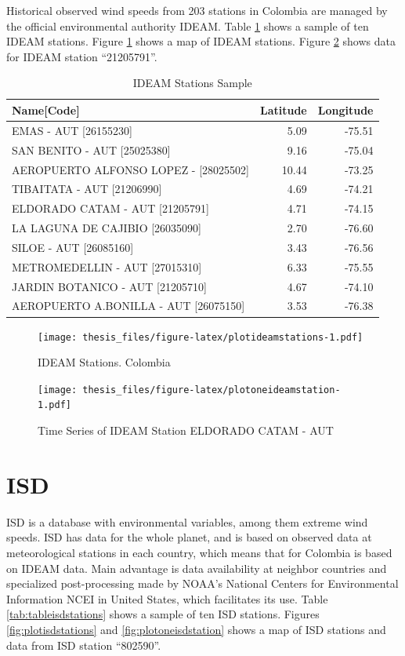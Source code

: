 \documentclass[12pt,oneside]{reedthesis}
\begin{document}
Historical observed wind speeds from 203 stations in Colombia are managed by the official environmental authority IDEAM. Table \ref{tab:tableideamstations} shows a sample of ten IDEAM stations. Figure \ref{fig:plotideamstations} shows a map of IDEAM stations. Figure \ref{fig:plotoneideamstation} shows data for IDEAM station ``21205791''.

\begingroup\fontsize{10}{12}\selectfont
\begin{longtable}[t]{lrr}
\caption[IDEAM Stations Sample]{\label{tab:tableideamstations}IDEAM Stations Sample}\\
\toprule
Name[Code] & Latitude & Longitude\\
\midrule
EMAS - AUT [26155230] & 5.09 & -75.51\\
SAN BENITO - AUT [25025380] & 9.16 & -75.04\\
AEROPUERTO ALFONSO LOPEZ - [28025502] & 10.44 & -73.25\\
TIBAITATA - AUT [21206990] & 4.69 & -74.21\\
ELDORADO CATAM - AUT [21205791] & 4.71 & -74.15\\
\addlinespace
LA LAGUNA DE CAJIBIO [26035090] & 2.70 & -76.60\\
SILOE - AUT [26085160] & 3.43 & -76.56\\
METROMEDELLIN - AUT [27015310] & 6.33 & -75.55\\
JARDIN BOTANICO  - AUT [21205710] & 4.67 & -74.10\\
AEROPUERTO A.BONILLA - AUT [26075150] & 3.53 & -76.38\\
\bottomrule
\end{longtable}
\endgroup{}
\begin{figure}
\centering
\texttt{[image: thesis\_files/figure-latex/plotideamstations-1.pdf]}
\caption{\label{fig:plotideamstations}IDEAM Stations. Colombia}
\end{figure}
\begin{figure}
\centering
\texttt{[image: thesis\_files/figure-latex/plotoneideamstation-1.pdf]}
\caption{\label{fig:plotoneideamstation}Time Series of IDEAM Station ELDORADO CATAM - AUT}
\end{figure}
\hypertarget{isd}{%
\section{ISD}\label{isd}}

ISD is a database with environmental variables, among them extreme wind speeds. ISD has data for the whole planet, and is based on observed data at meteorological stations in each country, which means that for Colombia is based on IDEAM data. Main advantage is data availability at neighbor countries and specialized post-processing made by NOAA's National Centers for Environmental Information NCEI in United States, which facilitates its use. Table \ref{tab:tableisdstations} shows a sample of ten ISD stations. Figures \ref{fig:plotisdstations} and \ref{fig:plotoneisdstation} shows a map of ISD stations and data from ISD station ``802590''.
\end{document}
